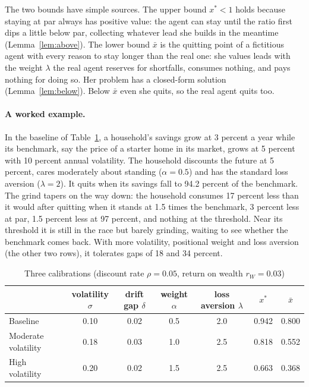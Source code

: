\documentclass[12pt]{article}
\theoremstyle{definition}
\theoremstyle{remark}
\newcommand{\OAref}[1]{\ref{#1}}
\theoremstyle{plain}
\theoremstyle{definition}
\begin{document}
The two bounds have simple sources. The upper bound $x^*<1$ holds because staying at par always has positive value: the agent can stay until the ratio first dips a little below par, collecting whatever lead she builds in the meantime (Lemma~\OAref{lem:above}). The lower bound $\bar x$ is the quitting point of a fictitious agent with every reason to stay longer than the real one: she values leads with the weight $\lambda$ the real agent reserves for shortfalls, consumes nothing, and pays nothing for doing so. Her problem has a closed-form solution (Lemma~\OAref{lem:below}). Below $\bar x$ even she quits, so the real agent quits too.

\paragraph{A worked example.} In the baseline of Table~\ref{tab:calib}, a household's savings grow at 3 percent a year while its benchmark, say the price of a starter home in its market, grows at 5 percent with 10 percent annual volatility. The household discounts the future at 5 percent, cares moderately about standing ($\alpha=0.5$) and has the standard loss aversion ($\lambda=2$). It quits when its savings fall to 94.2 percent of the benchmark. The grind tapers on the way down: the household consumes 17 percent less than it would after quitting when it stands at 1.5 times the benchmark, 3 percent less at par, 1.5 percent less at 97 percent, and nothing at the threshold. Near its threshold it is still in the race but barely grinding, waiting to see whether the benchmark comes back. With more volatility, positional weight and loss aversion (the other two rows), it tolerates gaps of 18 and 34 percent.

\begin{table}[t]
\centering\small
\caption{Three calibrations (discount rate $\rho=0.05$, return on wealth $r_W=0.03$)}\label{tab:calib}
\begin{tabular}{@{}lcccccc@{}}
\toprule
 & volatility $\sigma$ & drift gap $\delta$ & weight $\alpha$ & loss aversion $\lambda$ & $x^*$ & $\bar x$ \\
\midrule
Baseline & 0.10 & 0.02 & 0.5 & 2.0 & 0.942 & 0.800 \\
Moderate volatility & 0.18 & 0.03 & 1.0 & 2.5 & 0.818 & 0.552 \\
High volatility & 0.20 & 0.02 & 1.5 & 2.5 & 0.663 & 0.368 \\
\bottomrule
\end{tabular}
\end{table}
\end{document}
